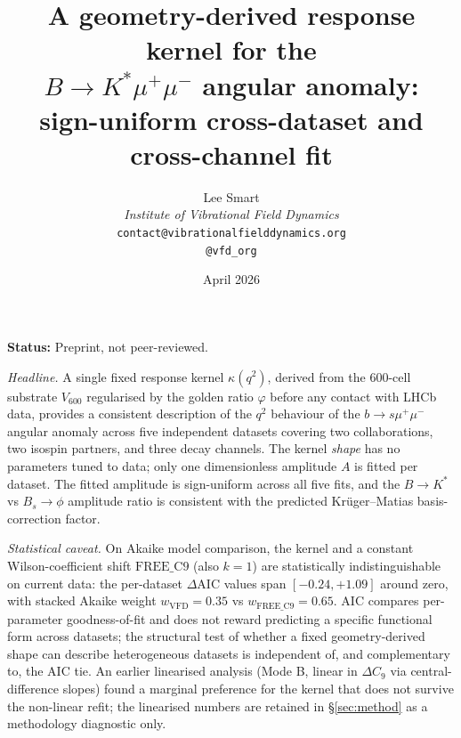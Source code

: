 \documentclass[11pt]{article}
\title{A geometry-derived response kernel for the\\
       $B \to K^{*}\mu^{+}\mu^{-}$ angular anomaly:\\
       sign-uniform cross-dataset and cross-channel fit}
\author{%
  Lee Smart\\[2pt]
  \textit{Institute of Vibrational Field Dynamics}\\[2pt]
  \texttt{contact@vibrationalfielddynamics.org}\\[2pt]
  \texttt{@vfd\_org}%
}
\date{April 2026}
\begin{document}
\maketitle

\noindent\textbf{Status:} Preprint, not peer-reviewed.

\noindent\emph{Headline.}
A single fixed response kernel $\kappa(q^{2})$, derived from the
600-cell substrate $V_{600}$ regularised by the golden ratio
$\varphi$ before any contact with LHCb data, provides a consistent
description of the $q^{2}$ behaviour of the
$b\to s\mu^{+}\mu^{-}$ angular anomaly across five independent
datasets covering two collaborations, two isospin partners, and three
decay channels. The kernel \emph{shape} has no
parameters tuned to data; only one dimensionless amplitude $A$ is
fitted per dataset. The fitted amplitude is sign-uniform across all
five fits, and the $B\to K^{*}$ vs $B_{s}\!\to\!\phi$ amplitude ratio
is consistent with the predicted Krüger--Matias basis-correction
factor.

\noindent\emph{Statistical caveat.}
On Akaike model comparison, the kernel and a constant
Wilson-coefficient shift $\mathrm{FREE\_C9}$ (also $k=1$) are
statistically indistinguishable on current data: the per-dataset
$\Delta\mathrm{AIC}$ values span $[-0.24, +1.09]$ around zero, with
stacked Akaike weight $w_{\mathrm{VFD}}=0.35$ vs
$w_{\mathrm{FREE\_C9}}=0.65$. AIC compares per-parameter
goodness-of-fit and does not reward predicting a specific functional
form across datasets; the structural test of whether a fixed
geometry-derived shape can describe heterogeneous datasets is
independent of, and complementary to, the AIC tie. An earlier
linearised analysis (Mode B, linear in $\Delta C_{9}$ via
central-difference slopes) found a marginal preference for the kernel
that does not survive the non-linear refit; the linearised numbers are
retained in \S\ref{sec:method} as a methodology diagnostic only.
\end{document}

